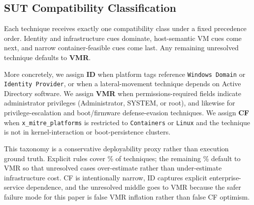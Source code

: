 \documentclass[sigconf]{acmart}
\begin{document}
\subsection{SUT Compatibility Classification}

Each technique receives exactly one compatibility class under a fixed precedence order. Identity and infrastructure cues dominate, host-semantic VM cues come next, and narrow container-feasible cues come last. Any remaining unresolved technique defaults to \textbf{VMR}.

More concretely, we assign \textbf{ID} when platform tags reference \texttt{Windows Domain} or \texttt{Identity Provider}, or when a lateral-movement technique depends on Active Directory software. We assign \textbf{VMR} when permissions-required fields indicate administrator privileges (Administrator, SYSTEM, or root), and likewise for privilege-escalation and boot/firmware defense-evasion techniques. We assign \textbf{CF} when \texttt{x\_mitre\_platforms} is restricted to \texttt{Containers} or \texttt{Linux} and the technique is not in kernel-interaction or boot-persistence clusters.

This taxonomy is a conservative deployability proxy rather than execution ground truth. Explicit rules cover \compatibilityexplicitassignmentpercentage\% of techniques; the remaining \compatibilityfallbackassignmentpercentage\% default to VMR so that unresolved cases over-estimate rather than under-estimate infrastructure cost. CF is intentionally narrow, ID captures explicit enterprise-service dependence, and the unresolved middle goes to VMR because the safer failure mode for this paper is false VMR inflation rather than false CF optimism.
\end{document}
